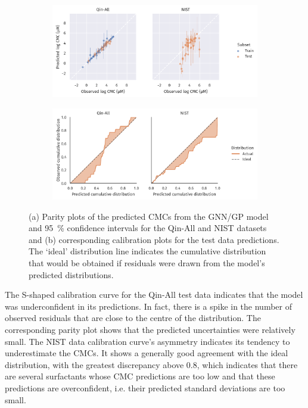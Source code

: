\begin{figure}
    \centering
    \begin{subfigure}{\textwidth}
        \includegraphics[width=\textwidth]{images/uq-parity.pdf}
        \caption{}
        \label{fig:uq-parity}
    \end{subfigure}
    \begin{subfigure}{\textwidth}
        \includegraphics[width=\textwidth]{images/uq-calibration.pdf}
        \caption{}
        \label{fig:uq-calibration}
    \end{subfigure}
    \caption{(a) Parity plots of the predicted CMCs from the GNN/GP model and \SI{95}{\%}
        confidence intervals for the Qin-All and NIST datasets and (b)
        corresponding calibration plots for the test data predictions. The
        `ideal' distribution line indicates the cumulative distribution that
        would be obtained if residuals were drawn from the model's predicted
        distributions.}
\end{figure}

The S-shaped calibration curve for the Qin-All test data indicates that the
model was underconfident in its predictions. In fact, there is a spike in the
number of observed residuals that are close to the centre of the distribution.
The corresponding parity plot shows that the predicted uncertainties were
relatively small. The NIST data calibration curve's asymmetry indicates its
tendency to underestimate the CMCs. It shows a generally good agreement with the
ideal distribution, with the greatest discrepancy above \num{0.8}, which
indicates that there are several surfactants whose CMC predictions are too low
and that these predictions are overconfident, i.e. their predicted standard
deviations are too small.

